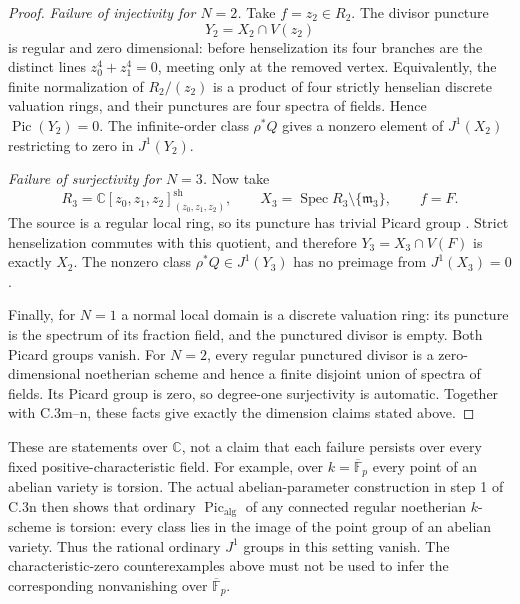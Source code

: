 \begin{proof}
\emph{Failure of injectivity for $N=2$.}
Take $f=z_2\in R_2$. The divisor puncture
\[
                         Y_2=X_2\cap V(z_2)
\]
is regular and zero dimensional: before
henselization its four branches are the
distinct lines $z_0^4+z_1^4=0$, meeting only
at the removed vertex. Equivalently, the
finite normalization of $R_2/(z_2)$ is a
product of four strictly henselian discrete
valuation rings, and their punctures are
four spectra of fields. Hence
$\operatorname{Pic}(Y_2)=0$. The infinite-order
class $\rho^*Q$ gives a nonzero element of
$J^1(X_2)$ restricting to zero in $J^1(Y_2)$.

\emph{Failure of surjectivity for $N=3$.}
Now take
\[
 R_3=\mathbb C[z_0,z_1,z_2]_{(z_0,z_1,z_2)}^{\mathrm{sh}},
 \qquad X_3=\operatorname{Spec}R_3\setminus\{\mathfrak m_3\},
 \qquad f=F.
\]
The source is a regular local ring, so its
puncture has trivial Picard group
\citep[Lemma 52.27.5, Tag 0F2H]{D_StacksRegularPuncture}.
Strict henselization commutes with this quotient,
and therefore $Y_3=X_3\cap V(F)$ is exactly $X_2$.
The nonzero class $\rho^*Q\in J^1(Y_3)$ has no
preimage from $J^1(X_3)=0$.

Finally, for $N=1$ a normal local domain is a
discrete valuation ring: its puncture is the
spectrum of its fraction field, and the punctured
divisor is empty. Both Picard groups vanish.
For $N=2$, every regular punctured divisor is
a zero-dimensional noetherian scheme and hence
a finite disjoint union of spectra of fields.
Its Picard group is zero, so degree-one
surjectivity is automatic. Together with C.3m--n,
these facts give exactly the dimension claims
stated above.
\end{proof}

These are statements over $\mathbb C$, not a
claim that each failure persists over every
fixed positive-characteristic field. For example,
over $k=\overline{\mathbb F}_p$ every point of an
abelian variety is torsion. The actual
abelian-parameter construction in step 1 of C.3n
then shows that ordinary $\operatorname{Pic}_{\mathrm{alg}}$
of any connected regular noetherian $k$-scheme
is torsion: every class lies in the image of
the point group of an abelian variety. Thus
the rational ordinary $J^1$ groups in this
setting vanish. The characteristic-zero
counterexamples above must not be used to
infer the corresponding nonvanishing over
$\overline{\mathbb F}_p$.

